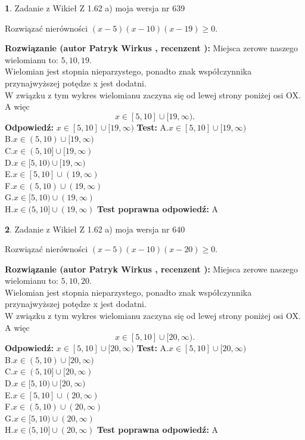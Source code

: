 \documentclass[12pt, a4paper]{article}
\theoremstyle{definition} %
\newtheorem{zad}{}
\newcommand{\zadStart}[1]{\begin{zad}#1\newline}
\newcommand{\zadStop}{\end{zad}}
\newcommand{\rozwStart}[2]{\noindent \textbf{Rozwiązanie (autor #1 , recenzent #2): }\newline}
\newcommand{\rozwStop}{\newline}
\newcommand{\odpStart}{\noindent \textbf{Odpowiedź:}\newline}
\newcommand{\odpStop}{\newline}
\newcommand{\testStart}{\noindent \textbf{Test:}\newline}
\newcommand{\testStop}{\newline}
\newcommand{\kluczStart}{\noindent \textbf{Test poprawna odpowiedź:}\newline}
\newcommand{\kluczStop}{\newline}
\begin{document}
\zadStart{Zadanie z Wikieł Z 1.62 a) moja wersja nr 639}

Rozwiązać nierówności $(x-5)(x-10)(x-19)\ge0$.
\zadStop
\rozwStart{Patryk Wirkus}{}
Miejsca zerowe naszego wielomianu to: $5, 10, 19$.\\
Wielomian jest stopnia nieparzystego, ponadto znak współczynnika przy\linebreak najwyższej potędze x jest dodatni.\\ W związku z tym wykres wielomianu zaczyna się od lewej strony poniżej osi OX. A więc $$x \in [5,10] \cup [19,\infty).$$
\rozwStop
\odpStart
$x \in [5,10] \cup [19,\infty)$
\odpStop
\testStart
A.$x \in [5,10] \cup [19,\infty)$\\
B.$x \in (5,10) \cup [19,\infty)$\\
C.$x \in (5,10] \cup [19,\infty)$\\
D.$x \in [5,10) \cup [19,\infty)$\\
E.$x \in [5,10] \cup (19,\infty)$\\
F.$x \in (5,10) \cup (19,\infty)$\\
G.$x \in [5,10) \cup (19,\infty)$\\
H.$x \in (5,10] \cup (19,\infty)$
\testStop
\kluczStart
A
\kluczStop



\zadStart{Zadanie z Wikieł Z 1.62 a) moja wersja nr 640}

Rozwiązać nierówności $(x-5)(x-10)(x-20)\ge0$.
\zadStop
\rozwStart{Patryk Wirkus}{}
Miejsca zerowe naszego wielomianu to: $5, 10, 20$.\\
Wielomian jest stopnia nieparzystego, ponadto znak współczynnika przy\linebreak najwyższej potędze x jest dodatni.\\ W związku z tym wykres wielomianu zaczyna się od lewej strony poniżej osi OX. A więc $$x \in [5,10] \cup [20,\infty).$$
\rozwStop
\odpStart
$x \in [5,10] \cup [20,\infty)$
\odpStop
\testStart
A.$x \in [5,10] \cup [20,\infty)$\\
B.$x \in (5,10) \cup [20,\infty)$\\
C.$x \in (5,10] \cup [20,\infty)$\\
D.$x \in [5,10) \cup [20,\infty)$\\
E.$x \in [5,10] \cup (20,\infty)$\\
F.$x \in (5,10) \cup (20,\infty)$\\
G.$x \in [5,10) \cup (20,\infty)$\\
H.$x \in (5,10] \cup (20,\infty)$
\testStop
\kluczStart
A
\kluczStop
\end{document}
